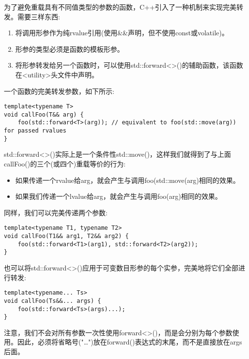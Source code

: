 为了避免重载具有不同值类型的参数的函数，C++引入了一种机制来实现完美转发。需要三样东西:\par

\begin{enumerate}
	\item 将调用形参作为纯rvalue引用(使用\&\&声明，但不使用const或volatile)。
	\item 形参的类型必须是函数的模板形参。
	\item 将形参转发给另一个函数时，可以使用std::forward<>()的辅助函数，该函数在<utility>头文件中声明。
\end{enumerate}

一个函数的完美转发参数，如下所示:\par

\begin{lstlisting}[caption={}]
template<typename T>
void callFoo(T&& arg) {
	foo(std::forward<T>(arg)); // equivalent to foo(std::move(arg)) for passed rvalues
}
\end{lstlisting}

std::forward<>()实际上是一个条件性std::move()，这样我们就得到了与上面callFoo()的三个(或四个)重载等价的行为:

\begin{itemize}
	\item 如果传递一个rvalue给arg，就会产生与调用foo(std::move(arg)相同的效果。
	\item 如果我们传递一个lvalue给arg，就会产生与调用foo(arg)相同的效果。
\end{itemize}

同样，我们可以完美传递两个参数:\par

\begin{lstlisting}[caption={}]
template<typename T1, typename T2>
void callFoo(T1&& arg1, T2&& arg2) {
	foo(std::forward<T1>(arg1), std::forward<T2>(arg2));
}
\end{lstlisting}

也可以将std::forward<>()应用于可变数目形参的每个实参，完美地将它们全部进行转发:\par

\begin{lstlisting}[caption={}]
template<typename... Ts>
void callFoo(Ts&&... args) {
	foo(std::forward<Ts>(args)...);
}
\end{lstlisting}

注意，我们不会对所有参数一次性使用forward<>()，而是会分别为每个参数使用。因此，必须将省略号("…")放在forward()表达式的末尾，而不是直接放在args后面。\par

